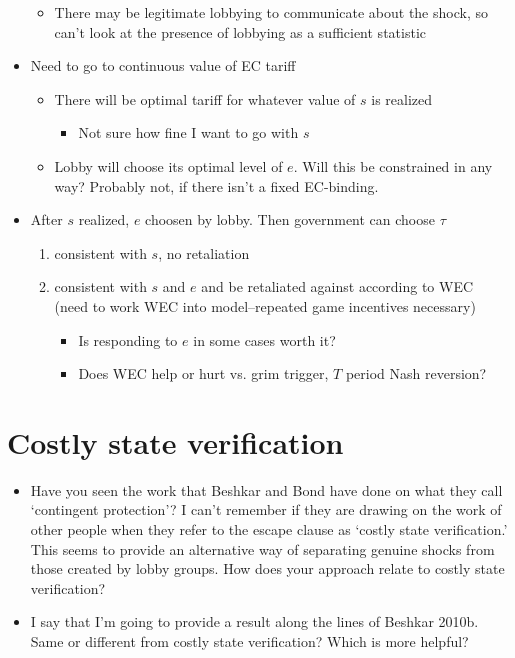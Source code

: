 \documentclass[12pt]{article}
\begin{document}
\begin{itemize}
				\begin{itemize}
					\item There may be legitimate lobbying to communicate about the shock, so can't look at the presence of lobbying as a sufficient statistic
				\end{itemize}
			\item Need to go to continuous value of EC tariff
				\begin{itemize}
					\item There will be optimal tariff for whatever value of $s$ is realized
						\begin{itemize}
							\item Not sure how fine I want to go with $s$
						\end{itemize}
					\item Lobby will choose its optimal level of $e$. Will this be constrained in any way? Probably not, if there isn't a fixed EC-binding.
				\end{itemize}
			\item After $s$ realized, $e$ choosen by lobby. Then government can choose $\tau$
				\begin{enumerate}
					\item consistent with $s$, no retaliation
					\item consistent with $s$ and $e$ and be retaliated against according to WEC (need to work WEC into model--repeated game incentives necessary)
						\begin{itemize}
							\item Is responding to $e$ in some cases worth it?
							\item Does WEC help or hurt vs. grim trigger, $T$ period Nash reversion?
						\end{itemize}
				\end{enumerate}
		\end{itemize}


\section{Costly state verification}
		\begin{itemize}
				\item Have you seen the work that Beshkar and Bond have done on what they call `contingent protection'?  I can't remember if they are drawing on the work of other people when they refer to the escape clause as `costly state verification.'  This seems to provide an alternative way of separating genuine shocks from those created by lobby groups.  How does your approach relate to costly state verification?
				\item I say that I'm going to provide a result along the lines of Beshkar 2010b. Same or different from costly state verification? Which is more helpful?
		\end{itemize}
\end{document}
